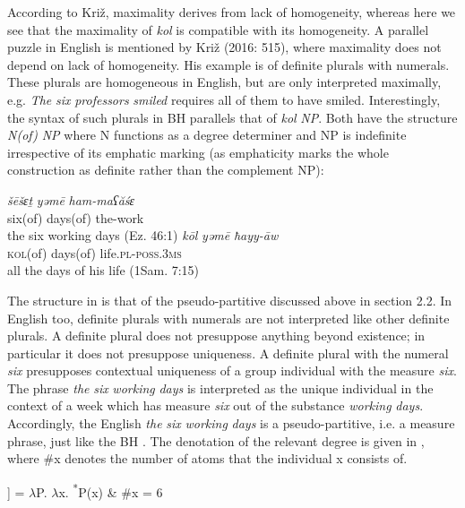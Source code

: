 \documentclass[output=paper]{langsci/langscibook}
\begin{document}
According to Križ, maximality derives from lack of homogeneity, whereas here we see that the maximality of \textit{kol} is compatible with its homogeneity. A parallel puzzle in English is mentioned by Križ (2016: 515), where maximality does not depend on lack of homogeneity. His example is of definite plurals with numerals. These plurals are homogeneous in English, but are only interpreted maximally, e.g. \textit{The} \textit{six} \textit{professors} \textit{smiled} requires all of them to have smiled. Interestingly, the syntax of such plurals in BH parallels that of \textit{kol} \textit{NP}. Both have the structure \textit{N(of)} \textit{NP} where N functions as a degree determiner and NP is indefinite irrespective of its emphatic marking (as emphaticity marks the whole construction as definite rather than the complement NP):  

\ea%
    \label{ex:doron:31}
    \ea
    \gll \textit{šēšɛṯ}      \textit{yəmē}      \textit{ham-maʕăśɛ}       \\
         six(of)  days(of)  the-work              \\
    \glt the six working days  (Ez. 46:1)                  
    \ex  
    \gll \textit{kōl}          \textit{yəmē}        \textit{ħayy-āw} \\
         \textsc{kol(}of)  days(of)   life.\textsc{pl-poss.3ms}\\
    \glt all the days of his life  (1Sam. 7:15)
    \z
\z

The structure in  is that of the pseudo-partitive discussed above in section 2.2. In English too, definite plurals with numerals are not interpreted like other definite plurals. A definite plural does not presuppose anything beyond existence; in particular it does not presuppose uniqueness. A definite plural with the numeral \textit{six} presupposes contextual uniqueness of a group individual with the measure \textit{six}. The phrase \textit{the} \textit{six} \textit{working} \textit{days} is interpreted as the unique individual in the context of a week which has measure \textit{six} out of the substance \textit{working} \textit{days}. Accordingly, the English \textit{the} \textit{six} \textit{working} \textit{days} is a pseudo-partitive, i.e. a measure phrase, just like the BH . The denotation of the relevant degree is given in , where \#x denotes the number of atoms that the individual x consists of. 

\ea%
    \label{ex:doron:32}\relax
     [[\textit{šēšɛṯ}]] = ${\lambda}$P. ${\lambda}$x. \textsuperscript{*}P(x) \& \#x = 6
\z
\end{document}
